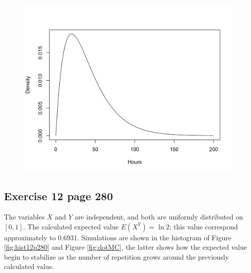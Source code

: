 \documentclass[10pt,leter,openany]{article}
\begin{document}
\begin{figure}
	\begin{center}
		\includegraphics[scale=0.15]{img/dens_3_278}
		\label{fig:dens}
	\end{center}
\end{figure}

\subsection{Exercise 12 page 280}

The variables $ X $ and $ Y $ are independent, and both are uniformly distributed on $\left[ 0,1\right]$.  The calculated expected value $E(X^{Y}) = \ln2$; this value correspond approximately to 0.6931. Simulations are shown in the histogram of Figure \ref{fig:hist12p280} and Figure \ref{fig:dotMC}, the latter shows how the expected value begin to stabilize as the number of repetition grows around the previously calculated value.
\end{document}
